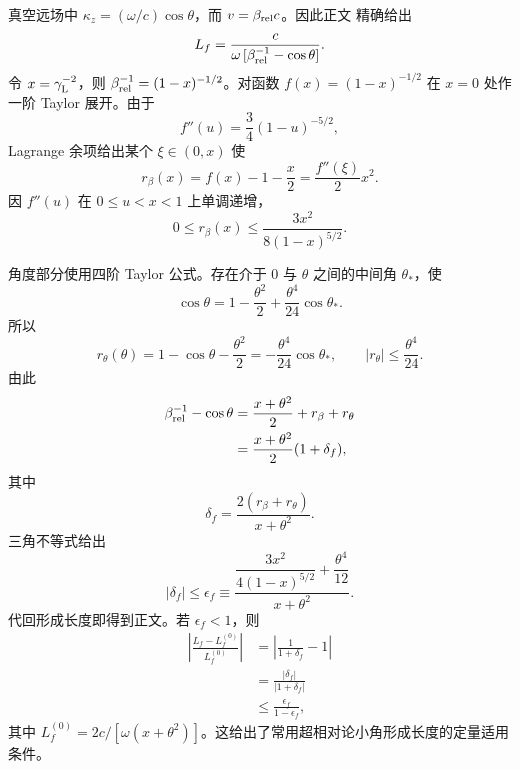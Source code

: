 \begin{derivation}[超相对论辐射的形成长度]
真空远场中 $\kappa_z=(\omega/c)\cos\theta$，而 $v=\beta_{\rm rel}c$。因此正文 精确给出
\begin{equation*}
L_f
=\frac{c}{\omega\,[\beta_{\rm rel}^{-1}-\cos\theta]}.
\end{equation*}
令 $x=\gamma_{\rm L}^{-2}$，则
$\beta_{\rm rel}^{-1}=(1-x)^{-1/2}$。对函数
$f(x)=(1-x)^{-1/2}$ 在 $x=0$ 处作一阶 Taylor 展开。由于
\begin{equation*}
f''(u)=\frac{3}{4}(1-u)^{-5/2},
\end{equation*}
Lagrange 余项给出某个 $\xi\in(0,x)$ 使
\begin{equation*}
r_\beta(x)
=f(x)-1-\frac{x}{2}
=\frac{f''(\xi)}{2}x^2.
\end{equation*}
因 $f''(u)$ 在 $0\le u<x<1$ 上单调递增，
\begin{equation*}
0\le r_\beta(x)
\le\frac{3x^2}{8(1-x)^{5/2}}.
\end{equation*}

角度部分使用四阶 Taylor 公式。存在介于 $0$ 与 $\theta$ 之间的中间角 $\theta_*$，使
\begin{equation*}
\cos\theta
=1-\frac{\theta^2}{2}
+\frac{\theta^4}{24}\cos\theta_*.
\end{equation*}
所以
\begin{equation*}
r_\theta(\theta)
=1-\cos\theta-\frac{\theta^2}{2}
=-\frac{\theta^4}{24}\cos\theta_*,
\qquad
|r_\theta|\le\frac{\theta^4}{24}.
\end{equation*}
由此
\begin{align*}
\beta_{\rm rel}^{-1}-\cos\theta
&=\frac{x+\theta^2}{2}+r_\beta+r_\theta\\
&=\frac{x+\theta^2}{2}(1+\delta_f),
\end{align*}
其中
\begin{equation*}
\delta_f
=\frac{2(r_\beta+r_\theta)}{x+\theta^2}.
\end{equation*}
三角不等式给出
\begin{equation*}
|\delta_f|
\le
\boxed{
\epsilon_f
\equiv
\frac{
\dfrac{3x^2}{4(1-x)^{5/2}}
+\dfrac{\theta^4}{12}
}{x+\theta^2}}.
\end{equation*}
代回形成长度即得到正文。若 $\epsilon_f<1$，则
\begin{align*}
\left|\frac{L_f-L_f^{(0)}}{L_f^{(0)}}\right|
&=\left|\frac1{1+\delta_f}-1\right|\\
&=\frac{|\delta_f|}{|1+\delta_f|}\\
&\le\frac{\epsilon_f}{1-\epsilon_f},
\end{align*}
其中
$L_f^{(0)}=2c/[\omega(x+\theta^2)]$。这给出了常用超相对论小角形成长度的定量适用条件。
\end{derivation}


